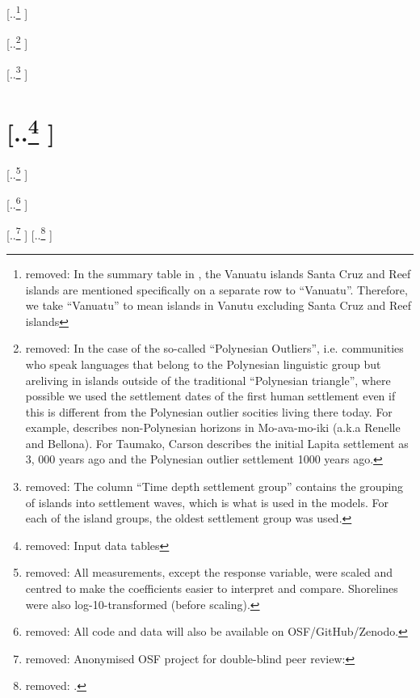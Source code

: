 \documentclass[unnumsec,webpdf,modern,medium]{oup-authoring-template}
\providecommand{\DIFdeltex}[1]{{\protect\color{red} [..\footnote{removed: #1} ]}} %
\providecommand{\DIFdel}[1]{\texorpdfstring{\DIFdeltex{#1}}{}} %
\begin{document}
\DIFdel{In the summary table in \citet{rieth_cochrane_2018},  the Vanuatu islands Santa Cruz and Reef islands are mentioned specifically on a separate row to ``Vanuatu''. Therefore, we take ``Vanuatu'' to mean islands in Vanutu excluding Santa Cruz and Reef islands 
}%

\DIFdel{In the case of the so-called ``Polynesian Outliers'', i.e. communities who speak languages that belong to the Polynesian linguistic group but areliving in islands outside of the traditional ``Polynesian triangle'', where possible we used the settlement dates of the first human settlement even if this is different from the Polynesian outlier socities living there today. For example, \citet{carson2012recent} describes non-Polynesian horizons in Mo-ava-mo-iki (a.k.a Renelle and Bellona). For Taumako, Carson describes the initial Lapita settlement as 3, 000 years ago and the Polynesian outlier settlement 1000 years ago.
}%

\DIFdel{The column ``Time depth settlement group'' contains the grouping of islands into settlement waves, which is what is used in the models. For each of the island groups, the oldest settlement group was used.
}%



\section{\DIFdel{Input data tables}}
\addtocounter{section}{-1}%
\DIFdel{All measurements, except the response variable, were scaled and centred to make the coefficients easier to interpret and compare. Shorelines were also log-10-transformed (before scaling). 
}%

\DIFdel{All code and data will also be available on OSF/GitHub/Zenodo.
}%

\DIFdel{Anonymised OSF project for double-blind peer review: }%
\DIFdel{.
}%
\end{document}
